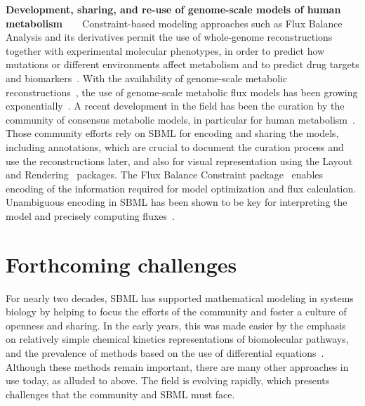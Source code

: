 \documentclass[]{draft-sbml-paper}
\begin{document}
\textbf{Development, sharing, and re-use of genome-scale models of human metabolism}~~~~Constraint-based modeling approaches such as Flux Balance Analysis and its derivatives permit the use of whole-genome reconstructions together with experimental molecular phenotypes, in order to predict how mutations or different environments affect metabolism and to predict drug targets and biomarkers~\citep{savinell1992network, obrien2015}.  With the availability of genome-scale metabolic reconstructions~\citep{edwards1999systems}, the use of genome-scale metabolic flux models has been growing exponentially~\citep{Bordbar2014a}. A recent development in the field has been the curation by the community of consensus metabolic models, in particular for human metabolism~\citep{brunk2018}. Those community efforts rely on SBML for encoding and sharing the models, including annotations, which are crucial to document the curation process and use the reconstructions later, and also for visual representation using the Layout~\citep{Gauges2015} and Rendering~\citep{Bergmann2018sbml} packages. The Flux Balance Constraint package~\citep{Olivier2018a} enables encoding of the information required for model optimization and flux calculation. Unambiguous encoding in SBML has been shown to be key for interpreting the model and precisely computing fluxes~\citep{Ebrahim2015}.

\hrulefill
\newpage

\section*{Forthcoming challenges}

For nearly two decades, SBML has supported mathematical modeling in systems biology by helping to focus the efforts of the community and foster a culture of openness and sharing. In the early years, this was made easier by the emphasis on relatively simple chemical kinetics representations of biomolecular pathways, and the prevalence of methods based on the use of differential equations~\citep{hubner2011applications}.  Although these methods remain important, there are many other approaches in use today, as alluded to above.  The field is evolving rapidly, which presents challenges that the community and SBML must face.
\end{document}
